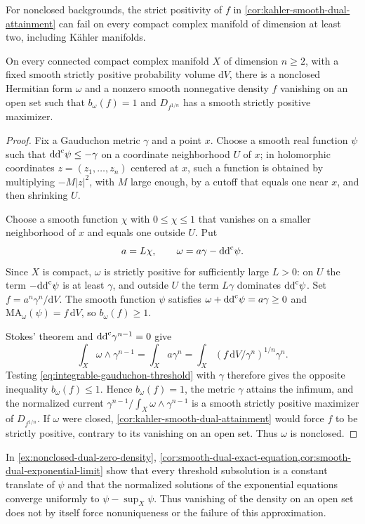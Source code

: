 For nonclosed backgrounds, the strict positivity of $f$ in \cref{cor:kahler-smooth-dual-attainment} can fail on every compact complex manifold of dimension at least two, including K\"ahler manifolds.

\begin{example}\label{ex:nonclosed-dual-zero-density}
On every connected compact complex manifold $X$ of dimension $n\geq2$, with a fixed smooth strictly positive probability volume $\mathrm{d}V$, there is a nonclosed Hermitian form $\omega$ and a nonzero smooth nonnegative density $f$ vanishing on an open set such that $b_\omega(f)=1$ and $D_{f^{1/n}}$ has a smooth strictly positive maximizer.
\end{example}
\begin{proof}
Fix a Gauduchon metric $\gamma$ and a point $x$. Choose a smooth real function $\psi$ such that $\mathrm{dd}^{\mathrm{c}}\psi\leq-\gamma$ on a coordinate neighborhood $U$ of $x$; in holomorphic coordinates $z=(z_1,\ldots,z_n)$ centered at $x$, such a function is obtained by multiplying $-M|z|^2$, with $M$ large enough, by a cutoff that equals one near $x$, and then shrinking $U$.

Choose a smooth function $\chi$ with $0\leq\chi\leq1$ that vanishes on a smaller neighborhood of $x$ and equals one outside $U$. Put
\[
 a=L\chi,\qquad \omega=a\gamma-\mathrm{dd}^{\mathrm{c}}\psi.
\]
Since $X$ is compact, $\omega$ is strictly positive for sufficiently large $L>0$: on $U$ the term $-\mathrm{dd}^{\mathrm{c}}\psi$ is at least $\gamma$, and outside $U$ the term $L\gamma$ dominates $\mathrm{dd}^{\mathrm{c}}\psi$. Set $f=a^n\gamma^n/\mathrm{d}V$. The smooth function $\psi$ satisfies $\omega+\mathrm{dd}^{\mathrm{c}}\psi=a\gamma\geq0$ and $\mathrm{MA}_\omega(\psi)=f\,\mathrm{d}V$, so $b_\omega(f)\geq1$.

Stokes' theorem and $\mathrm{dd}^{\mathrm{c}}\gamma^{n-1}=0$ give
\[
 \int_X\omega\wedge\gamma^{n-1}
 =\int_Xa\gamma^n
 =\int_X(f\,\mathrm{d}V/\gamma^n)^{1/n}\gamma^n.
\]
Testing \eqref{eq:integrable-gauduchon-threshold} with $\gamma$ therefore gives the opposite inequality $b_\omega(f)\leq1$. Hence $b_\omega(f)=1$, the metric $\gamma$ attains the infimum, and the normalized current $\gamma^{n-1}/\int_X\omega\wedge\gamma^{n-1}$ is a smooth strictly positive maximizer of $D_{f^{1/n}}$. If $\omega$ were closed, \cref{cor:kahler-smooth-dual-attainment} would force $f$ to be strictly positive, contrary to its vanishing on an open set. Thus $\omega$ is nonclosed.
\end{proof}

In \cref{ex:nonclosed-dual-zero-density}, \cref{cor:smooth-dual-exact-equation,cor:smooth-dual-exponential-limit} show that every threshold subsolution is a constant translate of $\psi$ and that the normalized solutions of the exponential equations converge uniformly to $\psi-\sup_X\psi$. Thus vanishing of the density on an open set does not by itself force nonuniqueness or the failure of this approximation.


